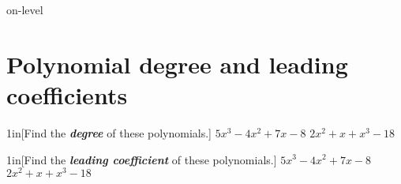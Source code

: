 \begin{taggedblock}{on-level}
    
\section{Polynomial degree and leading coefficients}

\begin{my2Problems}{1in}[Find the {\bfseries\itshape degree} of these polynomials.]
    {
        $ 5x^3 - 4x^2 + 7x - 8$
    }
    {
        $2x^2 + x + x^3 - 18$
    }
\end{my2Problems}

\begin{my2Problems}{1in}[Find the {\bfseries\itshape leading coefficient} of these polynomials.]
    {
        $ 5x^3 - 4x^2 + 7x - 8$
    }
    {
        $2x^2 + x + x^3 - 18$
    }
\end{my2Problems}


\end{taggedblock}